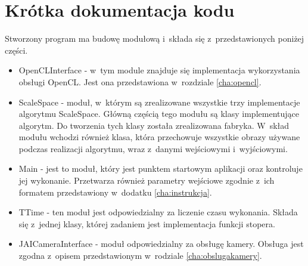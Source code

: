 \chapter{Krótka dokumentacja kodu}
\label{cha:dokumentacja}

Stworzony program ma budowę modułową i~składa się z~przedstawionych poniżej części.

\begin{itemize}
\item OpenCLInterface - w~tym module znajduje się implementacja wykorzystania obsługi OpenCL. Jest ona przedstawiona w~rozdziale \ref{cha:opencl}.
\item ScaleSpace - moduł, w~którym są zrealizowane wszystkie trzy implementacje algorytmu ScaleSpace. Główną częścią tego modułu są klasy implementujące algorytm. Do tworzenia tych klasy została zrealizowana fabryka. W~skład modułu wchodzi również klasa, która przechowuje wszystkie obrazy używane podczas realizacji algorytmu, wraz z~danymi wejściowymi i~wyjściowymi.
\item Main - jest to moduł, który jest punktem startowym aplikacji oraz kontroluje jej wykonanie. Przetwarza również parametry wejściowe zgodnie z~ich formatem przedstawiony w~dodatku \ref{cha:instrukcja}.
\item TTime - ten moduł jest odpowiedzialny za liczenie czasu wykonania. Składa się z~jednej klasy, której zadaniem jest implementacja funkcji stopera.
\item JAICameraInterface - moduł odpowiedzialny za obsługę kamery. Obsługa jest zgodna z~opisem przedstawionym w~rodziale \ref{cha:obslugakamery}.
\end{itemize}
